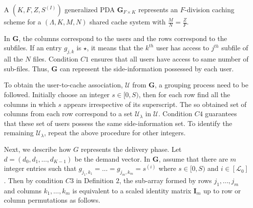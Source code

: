 \documentclass[conference,a4paper,10pt]{IEEEtran}
\begin{document}
A $(K, F, Z, S^{(I)})$ generalized PDA $\mathbf{G}_{F\times K}$ represents an $F$-division caching scheme for a $(\Lambda,K,M,N)$ shared cache system with $\frac{M}{N}=\frac{Z}{F}$. 

In $\mathbf{G}$, the columns correspond to the users and the rows correspond to the subfiles. If an entry $g_{j,k}$ is $\star$, it means that the $k^{th}$ user has access to  $j^{th}$ subfile of all the $N$ files. Condition $C1$ ensures that all users have access to same number of sub-files. Thus, $\mathbf{G}$ can represent the side-information possessed by each user.

To obtain the user-to-cache association, $\mathcal{U}$ from $\mathbf{G}$, a grouping process need to be followed. Initially choose an integer $s \in [0,S)$, then for each row find all the columns in which $s$ appears irrespective of its superscript. The so obtained set of columns from each row correspond to a set $\mathcal{U}_{\lambda}$ in $\mathcal{U}$. Condition $C4$ guarantees that these set of users possess the same side-information set. To identify the remaining $\mathcal{U}_{\lambda}$, repeat the above procedure for other integers. 

Next, we describe how $G$ represents the delivery phase. Let $d=(d_0,d_1,\ldots,d_{K-1})$ be the demand vector.
In $\mathbf{G}$, assume that there are $m$ integer entries such that $g_{j_1,k_1}=\ldots=g_{j_m,k_m}=s^{(i)}$ where $s \in [0,S)$ and $i \in [\mathcal{L}_0]$. Then by condition $C3$ in Definition $2$, the sub-array formed by rows $j_1, \ldots, j_m$ and columns $k_1,\ldots,k_m$ is equivalent to a scaled identity matrix $\mathbf{I}_{m}$ up to row or column permutations as follows. 
\end{document}
